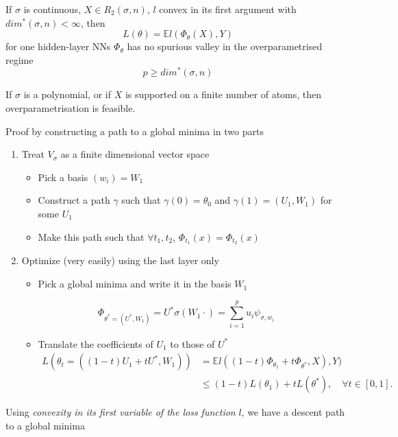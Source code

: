 \documentclass{beamer}
\begin{document}
\begin{frame}
	\begin{theorem}
		If $\sigma$ is continuous, $X\in R_2(\sigma, n)$, $l$ convex in its first argument with $dim^*(\sigma, n) <\infty$, then
		\begin{equation*}
			L(\theta) = \mathbb{E} l(\Phi_\theta(X),Y)
		\end{equation*}
	for one hidden-layer NNs $\Phi_\theta$ has no spurious valley in the overparametrised regime
		\begin{equation*}
			p\geq dim^*(\sigma, n)
		\end{equation*}
	\end{theorem}
	
	\begin{corollary}
		If $\sigma$ is a polynomial, or if $X$ is supported on a finite number of atoms, then overparametrisation is feasible.
	\end{corollary}
\end{frame}

\begin{frame}
	Proof by constructing a path to a global minima in two parts
	\begin{enumerate}
		\item Treat $V_\sigma$ as a finite dimensional vector space
				\begin{itemize}
					\item Pick a basis $(w_i) = W_1$
					\item Construct a path $\gamma$ such that $\gamma(0) = \theta_0$ and $\gamma(1) = (U_1, W_1)$ for some $U_1$
					\item Make this path such that $\forall t_1, t_2$, $\Phi_{t_1}(x) = \Phi_{t_2}(x)$		
				\end{itemize}
		\item Optimize (very easily) using the last layer only
			\begin{itemize}
				\item Pick a global minima and write it in the basis $W_1$
			\end{itemize}
					\begin{equation*}
						\Phi_{\theta^*=(U^*, W_1)} = U^*\sigma(W_1 \cdot) = \sum_{i=1}^p u_i\psi_{\sigma, w_i}
					\end{equation*}
			\begin{itemize}
				\item Translate the coefficients of $U_1$ to those of $U^*$
				\begin{align*}
					L(\theta_t = ((1-t)U_1 + tU^*, W_1)) &= \mathbb{E}l((1-t)\Phi_{\theta_1} + t\Phi_{\theta^*}, X), Y)\\
						&\leq (1-t)L(\theta_1) + tL(\theta^*), \quad \forall t\in [0,1].
				\end{align*}
			\end{itemize}
	\end{enumerate}
	Using \emph{convexity in its first variable of the loss function} $l$, we have a descent path to a global minima
\end{frame}
\end{document}
